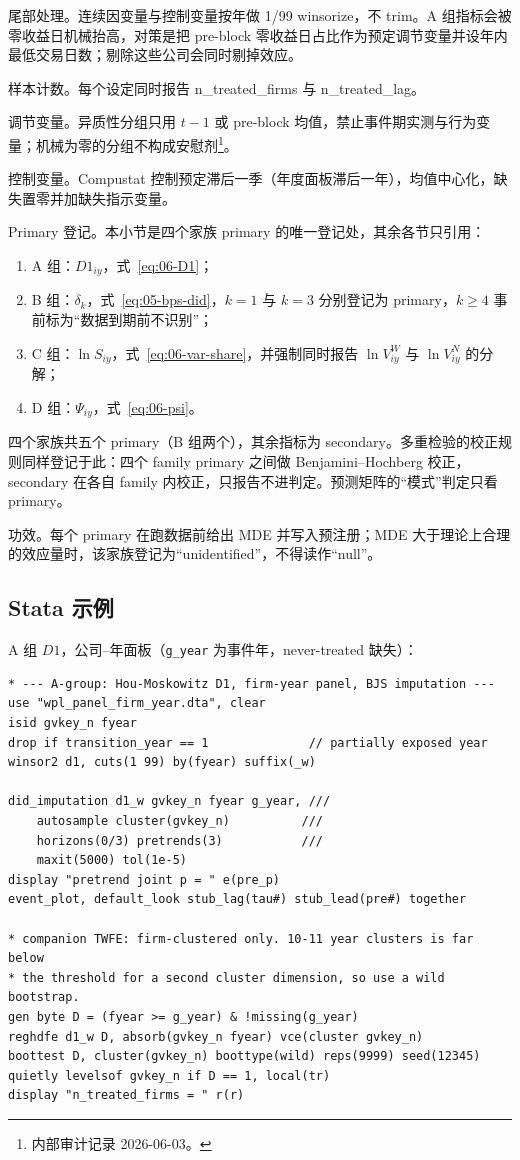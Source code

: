 \documentclass[a4paper,11pt]{ctexart}
\begin{document}
尾部处理。连续因变量与控制变量按年做 1/99 winsorize，不 trim。A 组指标会被零收益日机械抬高，对策是把 pre-block 零收益日占比作为预定调节变量并设年内最低交易日数；剔除这些公司会同时剔掉效应。

样本计数。每个设定同时报告 n\_treated\_firms 与 n\_treated\_lag。

调节变量。异质性分组只用 $t-1$ 或 pre-block 均值，禁止事件期实测与行为变量；机械为零的分组不构成安慰剂\footnote{内部审计记录 2026-06-03。}。

控制变量。Compustat 控制预定滞后一季（年度面板滞后一年），均值中心化，缺失置零并加缺失指示变量。

Primary 登记。本小节是四个家族 primary 的唯一登记处，其余各节只引用：
\begin{enumerate}[label=(\Alph*)]
\item A 组：$D1_{iy}$，式~\eqref{eq:06-D1}；
\item B 组：$\delta_k$，式~\eqref{eq:05-bps-did}，$k=1$ 与 $k=3$ 分别登记为 primary，$k\ge4$ 事前标为“数据到期前不识别”；
\item C 组：$\ln S_{iy}$，式~\eqref{eq:06-var-share}，并强制同时报告 $\ln V^{W}_{iy}$ 与 $\ln V^{N}_{iy}$ 的分解；
\item D 组：$\Psi_{iy}$，式~\eqref{eq:06-psi}。
\end{enumerate}
四个家族共五个 primary（B 组两个），其余指标为 secondary。多重检验的校正规则同样登记于此：四个 family primary 之间做 Benjamini--Hochberg 校正，secondary 在各自 family 内校正，只报告不进判定。预测矩阵的“模式”判定只看 primary。

功效。每个 primary 在跑数据前给出 MDE 并写入预注册；MDE 大于理论上合理的效应量时，该家族登记为“unidentified”，不得读作“null”。

\subsection{Stata 示例}\label{sec:06-stata}

A 组 $D1$，公司--年面板（\texttt{g\_year} 为事件年，never-treated 缺失）：

\begin{verbatim}
* --- A-group: Hou-Moskowitz D1, firm-year panel, BJS imputation ---
use "wpl_panel_firm_year.dta", clear
isid gvkey_n fyear
drop if transition_year == 1              // partially exposed year
winsor2 d1, cuts(1 99) by(fyear) suffix(_w)

did_imputation d1_w gvkey_n fyear g_year, ///
    autosample cluster(gvkey_n)          ///
    horizons(0/3) pretrends(3)           ///
    maxit(5000) tol(1e-5)
display "pretrend joint p = " e(pre_p)
event_plot, default_look stub_lag(tau#) stub_lead(pre#) together

* companion TWFE: firm-clustered only. 10-11 year clusters is far below
* the threshold for a second cluster dimension, so use a wild bootstrap.
gen byte D = (fyear >= g_year) & !missing(g_year)
reghdfe d1_w D, absorb(gvkey_n fyear) vce(cluster gvkey_n)
boottest D, cluster(gvkey_n) boottype(wild) reps(9999) seed(12345)
quietly levelsof gvkey_n if D == 1, local(tr)
display "n_treated_firms = " r(r)
\end{verbatim}
\end{document}

